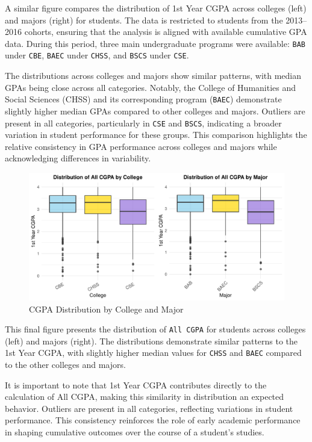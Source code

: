 \documentclass[
  12pt,
]{article}
\begin{document}
A similar figure compares the distribution of 1st Year CGPA across
colleges (left) and majors (right) for students. The data is restricted
to students from the 2013--2016 cohorts, ensuring that the analysis is
aligned with available cumulative GPA data. During this period, three
main undergraduate programs were available: \texttt{BAB} under
\texttt{CBE}, \texttt{BAEC} under \texttt{CHSS}, and \texttt{BSCS} under
\texttt{CSE}.

The distributions across colleges and majors show similar patterns, with
median GPAs being close across all categories. Notably, the College of
Humanities and Social Sciences (CHSS) and its corresponding program
(\texttt{BAEC}) demonstrate slightly higher median GPAs compared to
other colleges and majors. Outliers are present in all categories,
particularly in \texttt{CSE} and \texttt{BSCS}, indicating a broader
variation in student performance for these groups. This comparison
highlights the relative consistency in GPA performance across colleges
and majors while acknowledging differences in variability.

\newpage

\begin{figure}
\includegraphics[width=0.9\linewidth]{iesm315_report_files/figure-latex/unnamed-chunk-14-1} \caption{CGPA Distribution by College and Major}\label{fig:unnamed-chunk-14}
\end{figure}

This final figure presents the distribution of \texttt{All\ CGPA} for
students across colleges (left) and majors (right). The distributions
demonstrate similar patterns to the 1st Year CGPA, with slightly higher
median values for \texttt{CHSS} and \texttt{BAEC} compared to the other
colleges and majors.

It is important to note that 1st Year CGPA contributes directly to the
calculation of All CGPA, making this similarity in distribution an
expected behavior. Outliers are present in all categories, reflecting
variations in student performance. This consistency reinforces the role
of early academic performance in shaping cumulative outcomes over the
course of a student's studies.
\end{document}
